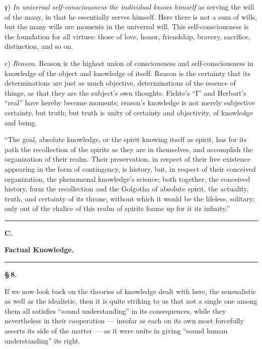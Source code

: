 \documentclass[12pt]{book}
\begin{document}
γ) \emph{In universal self-consciousness the individual knows himself} as serving
the will of the many, in that he essentially serves himself. Here there is not a
sum of wills, but the many wills are moments in the universal will. This
self-consciousness is the foundation for all virtues: those of love, honor,
friendship, bravery, sacrifice, distinction, and so on.

c) \emph{Reason.} Reason is the highest union of consciousness and
self-consciousness in knowledge of the object and knowledge of itself. Reason is
the certainty that its determinations are just as much objective, determinations
of the essence of things, as that they are the subject's own thoughts. Fichte's
``I'' and Herbart's ``real'' have hereby become moments; reason's knowledge is not
merely subjective certainty, but truth; but truth is unity of certainty and
objectivity, of knowledge and being.

``The goal, absolute knowledge, or the spirit knowing itself as spirit, has for its
path the recollection of the spirits as they are in themselves, and accomplish the
organization of their realm. Their preservation, in respect of their free existence
appearing in the form of contingency, is history, but, in respect of their
conceived organization, the phenomenal
knowledge's science; both together, the conceived history, form the recollection
and the Golgotha of absolute spirit, the actuality, truth, and certainty of its
throne, without which it would be the lifeless, solitary; only out of the chalice
of this realm of spirits foams up for it its infinity.''

\begin{center}\rule{2.5cm}{0.4pt}\end{center}

\begin{center}
  {\large\bfseries C.}\par\vspace{2pt}
  {\bfseries Factual Knowledge.}\par\vspace{4pt}
  \rule{2cm}{0.4pt}
\end{center}
{}

\begin{center}{\bfseries \S\,8.}\end{center}

\noindent If we now look back on the theories of knowledge dealt with here, the
sensualistic as well as the idealistic, then it is quite striking to us that not a
single one among them all satisfies ``sound understanding'' in its consequences,
while they nevertheless in their cooperation --- insofar as each on its own most
forcefully asserts its side of the matter --- as it were unite in giving ``sound
human understanding'' its right.
\end{document}
